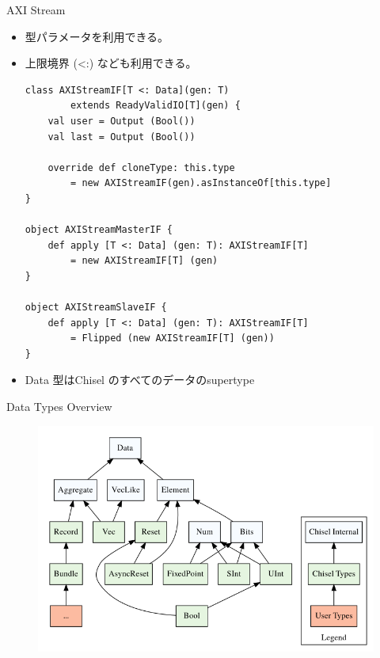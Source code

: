 \begin{frame}[fragile]{AXI Stream}
    \begin{itemize}
        \item 型パラメータを利用できる。
        \item 上限境界 (<:) なども利用できる。
        \begin{lstlisting}[caption={"AXI Stream Interface"}]
class AXIStreamIF[T <: Data](gen: T) 
        extends ReadyValidIO[T](gen) {
    val user = Output (Bool())
    val last = Output (Bool())

    override def cloneType: this.type 
        = new AXIStreamIF(gen).asInstanceOf[this.type]
}

object AXIStreamMasterIF {
    def apply [T <: Data] (gen: T): AXIStreamIF[T] 
        = new AXIStreamIF[T] (gen)
}

object AXIStreamSlaveIF {
    def apply [T <: Data] (gen: T): AXIStreamIF[T] 
        = Flipped (new AXIStreamIF[T] (gen))
}            
        \end{lstlisting}
        
        \item Data 型はChisel のすべてのデータのsupertype
    \end{itemize}
    
\end{frame}




\begin{frame}{Data Types Overview}
    \begin{figure}[h]
        \centering
        \includegraphics[width=\textwidth]{./figures/type_hierarchy.png}
    \end{figure}
\end{frame}



